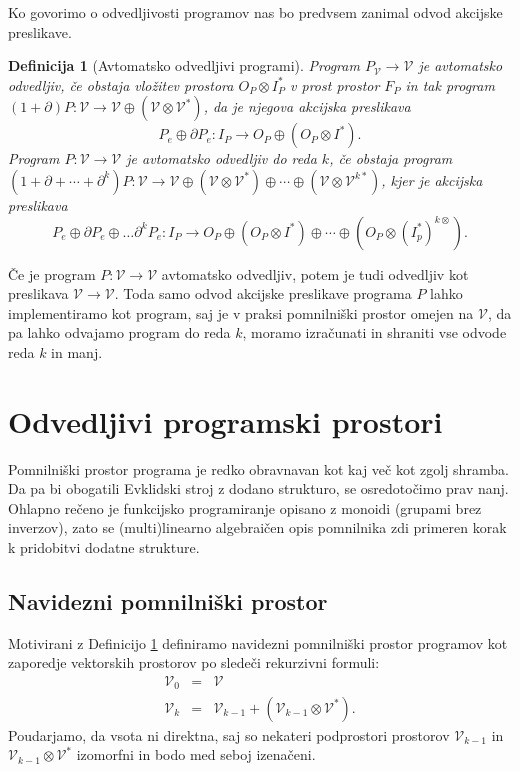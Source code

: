 \documentclass[a4paper, 12pt]{book}
\newcommand{\VV}{\mathcal{V}}
\newcommand{\D}{\partial}
\newtheorem{definicija}{Definicija}[chapter]
\begin{document}
Ko govorimo o odvedljivosti programov nas bo predvsem zanimal odvod akcijske preslikave.
\begin{definicija}[Avtomatsko odvedljivi programi]\label{def:autDef}
Program $P_\VV\to\VV$ je \emph{avtomatsko odvedljiv}, če obstaja vložitev prostora $O_P\otimes I_P^*$ v prost prostor $F_P$ in tak program $(1+\D )P:\VV\to \VV\oplus(\VV\otimes\VV^*)$, da je njegova akcijska preslikava
\begin{equation}
    \label{eq:program_derivative}
    P_e\oplus \D P_e:I_P\rightarrow O_P\oplus (O_P\otimes I^*).
  \end{equation}
Program $P:\VV\to\VV$ je \emph{avtomatsko odvedljiv do reda} $k$, če obstaja program $(1+\D+\cdots+\D^k)P:\VV\to \VV\oplus(\VV\otimes\VV^*)\oplus\cdots\oplus(\VV\otimes\VV^{k*})$, kjer je akcijska preslikava
\begin{equation}
    \label{eq:program_derivative_higher}
    P_e\oplus \D P_e\oplus \ldots \D^k P_e:I_P\rightarrow O_P\oplus \left(O_P\otimes I^*\right)\oplus\cdots\oplus \left( O_P\otimes \left( I_p^*\right)^{k\otimes} \right).
  \end{equation}
\end{definicija}

Če je program $P:\VV\to\VV$ avtomatsko odvedljiv, potem je tudi odvedljiv kot preslikava $\VV\to\VV$. Toda samo odvod akcijske preslikave programa $P$ lahko implementiramo kot program, saj je v praksi pomnilniški prostor omejen na $\VV$, da pa lahko odvajamo program do reda $k$, moramo izračunati in shraniti vse odvode reda $k$ in manj.

\chapter{Odvedljivi programski prostori} \label{ch:OdvProgPros}

Pomnilniški prostor programa je redko obravnavan kot kaj več kot zgolj shramba. Da pa bi obogatili Evklidski stroj z dodano strukturo, se osredotočimo prav nanj. Ohlapno rečeno je funkcijsko programiranje opisano z monoidi (grupami brez inverzov), zato se (multi)linearno algebraičen opis pomnilnika zdi primeren korak k pridobitvi dodatne strukture.

\section{Navidezni pomnilniški prostor}

Motivirani z Definicijo \ref{def:autDef} definiramo navidezni pomnilniški prostor programov kot zaporedje vektorskih prostorov po sledeči rekurzivni formuli:
\begin{eqnarray}
  \VV_0 &=& \VV\\
  \label{eq:universal_space}
  \VV_k &=& \VV_{k-1}+\left(\VV_{k-1}\otimes \VV^*\right).
\end{eqnarray}
Poudarjamo, da vsota ni direktna, saj so nekateri podprostori prostorov $\VV_{k-1}$ in $\VV_{k-1}\otimes\VV^*$ izomorfni in bodo med seboj izenačeni.
\end{document}
